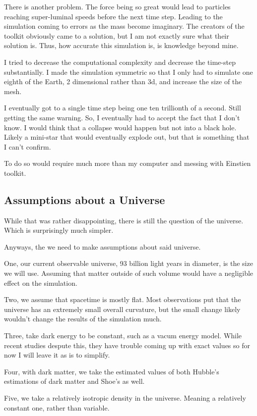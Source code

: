 There is another problem. The force being so great would lead to particles reaching super-luminal speeds before the next time step. Leading to the simulation coming to errors as the mass become imaginary. The creators of the toolkit obviously came to a solution, but I am not exactly sure what their solution is. Thus, how accurate this simulation is, is knowledge beyond mine.

I tried to decrease the computational complexity and decrease the time-step substantially. I made the simulation symmetric so that I only had to simulate one eighth of the Earth, 2 dimensional rather than 3d, and increase the size of the mesh.

I eventually got to a single time step being one ten trillionth of a second. Still getting the same warning. So, I eventually had to accept the fact that I don't know. I would think that a collapse would happen but not into a black hole. Likely a mini-star that would eventually explode out, but that is something that I can't confirm.

To do so would require much more than my computer and messing with Einstien toolkit.

\subsection{Assumptions about a Universe}

While that was rather disappointing, there is still the question of the universe. Which is surprisingly much simpler.

Anyways, the we need to make assumptions about said universe.

One, our current observable universe, 93 billion light years in diameter, is the size we will use. Assuming that matter outside of such volume would have a negligible effect on the simulation.

Two, we assume that spacetime is mostly flat. Most observations put that the universe has an extremely small overall curvature, but the small change likely wouldn't change the results of the simulation much.

Three, take dark energy to be constant, such as a vacum energy model. While recent studies despute this, they have trouble coming up with exact values so for now I will leave it as is to simplify.

Four, with dark matter, we take the estimated values of both Hubble's estimations of dark matter and Shoe's as well.

Five, we take a relatively isotropic density in the universe. Meaning a relatively constant one, rather than variable.

